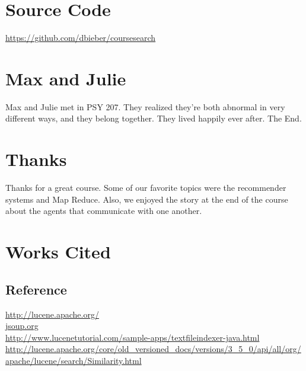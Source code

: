 \documentclass[12pt,letterpaper]{article}
\begin{document}
\appendix

\section{Source Code}
\url{https://github.com/dbieber/coursesearch}

\section{Max and Julie}
Max and Julie met in PSY 207. They realized they're both abnormal in very different ways, and they belong together. They lived happily ever after. The End.

\section{Thanks}
Thanks for a great course. Some of our favorite topics were the recommender systems and Map Reduce. Also, we enjoyed the story at the end of the course about the agents that communicate with one another. 

\section{Works Cited}
\subsection{Reference}
\url{http://lucene.apache.org/} \\
\url{jsoup.org} \\
\url{http://www.lucenetutorial.com/sample-apps/textfileindexer-java.html} \\
\url{http://lucene.apache.org/core/old_versioned_docs/versions/3_5_0/api/all/org/apache/lucene/search/Similarity.html} \\
\end{document}
